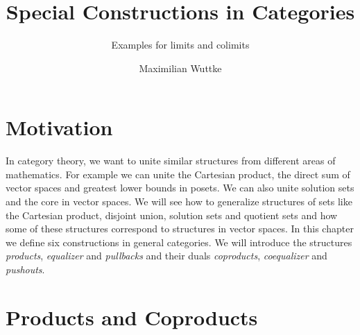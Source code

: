 \def\pathToRoot{../../}

\newcommand{\catA}[0]{\cat{A}}
\newcommand{\catB}[0]{\cat{B}}
\newcommand{\fbar}[0]{\bar{f}}
\newcommand{\ftilde}[0]{\tilde{f}}
\newcommand{\gbar}[0]{\bar{g}}
\newcommand{\gtilde}[0]{\tilde{g}}
\newcommand{\dunion}[0]{\sqcup}
\newcommand{\bigdunion}[0]{\bigsqcup}
\renewcommand{\demph}[1]{\emph{#1}} %

\newcommand{\setOf}[1]{\bigl \{ #1 \bigr \}}
\newcommand{\setMap}[2]{\setOf{#1 \,\big|\, #2}}
\newcommand{\pair}[2]{\bigl( #1 , #2 \bigr)}
\newcommand{\class}[1]{\bigl[ #1 \bigr]}
\newcommand{\choice}[1]{\bigl< #1 \bigr>}
\newcommand{\explainRel}[2]{\stackrel{\text{#1}}{#2}}
\newcommand{\family}[2]{\bigl( #1 \bigr)_{#2}}

\DeclareMathOperator{\core}{core}

\newtheorem{definition}{Definition}
\newtheorem{example}{Example}
\newtheorem{lemma}{Lemma}

\title{Special Constructions in Categories}
\subtitle{Examples for limits and colimits}

\author{Maximilian Wuttke}



\maketitle

\section*{Motivation}

In category theory, we want to unite similar structures from different areas of mathematics.
For example we can unite the Cartesian product, the direct sum of vector spaces and greatest lower bounds in posets.
We can also unite solution sets and the core in vector spaces.
We will see how to generalize structures of sets like the Cartesian product, disjoint union, solution sets and quotient sets and how some of these structures correspond to structures in vector spaces.
In this chapter we define six constructions in general categories.
We will introduce the structures \emph{products}, \emph{equalizer} and \emph{pullbacks} and their duals \emph{coproducts}, \emph{coequalizer} and \emph{pushouts}.

\section*{Products and Coproducts}

